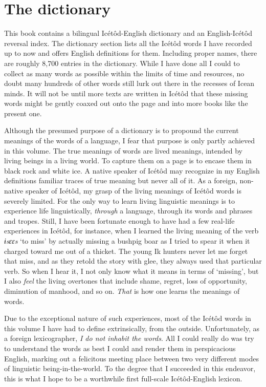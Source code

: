  
\section{The dictionary}\label{sec:1.2} 

This book contains a bilingual Icétôd-English dictionary and an English-Icétôd reversal index. The dictionary section lists all the Icétôd words I have recorded up to now and offers English definitions for them. Including proper names, there are roughly 8,700 entries in the dictionary. While I have done all I could to collect as many words as possible within the limits of time and resources, no doubt many hundreds of other words still lurk out there in the recesses of Icean minds. It will not be until more texts are written in Icétôd that these missing words might be gently coaxed out onto the page and into more books like the present one. 

Although the presumed purpose of a dictionary is to propound the current meanings of the words of a language, I fear that purpose is only partly achieved in this volume. The true meanings of words are lived meanings, intended by living beings in a living world. To capture them on a page is to encase them in black rock and white ice. A native speaker of Icétôd may recognize in my English definitions familiar traces of true meaning but never all of it. As a foreign, non-native speaker of Icétôd, my grasp of the living meanings of Icétôd words is severely limited. For the only way to learn living linguistic meanings is to experience life linguistically, \textit{through} a language, through its words and phrases and tropes. Still, I have been fortunate enough to have had a few real-life experiences in Icétôd, for instance, when I learned the living meaning of the verb \textit{ɨsɛɛs }‘to miss’ by actually missing a bushpig boar as I tried to spear it when it charged toward me out of a thicket. The young Ik hunters never let me forget that miss, and as they retold the story with glee, they always used that particular verb. So when I hear it, I not only know what it means in terms of ‘missing’, but I also \textit{feel} the living overtones that include shame, regret, loss of opportunity, diminution of manhood, and so on. \textit{That} is how one learns the meanings of words. 

Due to the exceptional nature of such experiences, most of the Icétôd words in this volume I have had to define extrinsically, from the outside. Unfortunately, as a foreign lexicographer, \textit{I do not inhabit the words}. All I could really do was try to understand the words as best I could and render them in perspicacious English, marking out a felicitous meeting place between two very different modes of linguistic being-in-the-world. To the degree that I succeeded in this endeavor, this is what I hope to be a worthwhile first full-scale Icétôd-English lexicon.

